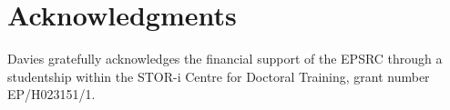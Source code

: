 \documentclass[conference]{IEEEtran}
\begin{document}

\section*{Acknowledgments}
Davies gratefully acknowledges the financial support of the EPSRC through a studentship within the STOR-i Centre for Doctoral Training, grant number EP/H023151/1.





%
%
%
%
%
\end{document}
